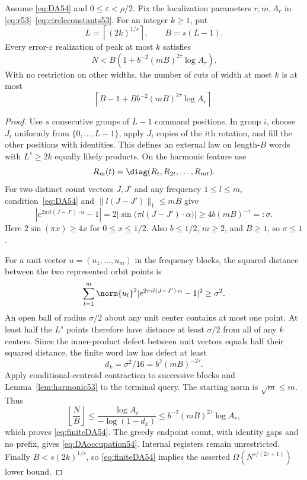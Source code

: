 \begin{theorem}\label{thm:arithmetic54}
Assume \eqref{eq:DA54} and $0\le\varepsilon<\rho/2$. Fix the localization parameters $r,m,A_r$ in \eqref{eq:r53}--\eqref{eq:circleconstants53}. For an integer $k\ge1$, put
\[
 L=\left\lceil(2k)^{1/s}\right\rceil,\qquad B=s(L-1).
\]
Every error-$\varepsilon$ realization of peak at most $k$ satisfies
\begin{equation}\label{eq:finiteDA54}
 N<B\left(1+b^{-2}(mB)^{2\tau}\log A_r\right).
\end{equation}
With no restriction on other widths, the number of cuts of width at most $k$ is at most
\begin{equation}\label{eq:DAoccupation54}
 \left\lceil B-1+B b^{-2}(mB)^{2\tau}\log A_r\right\rceil.
\end{equation}
\end{theorem}
\begin{proof}
Use $s$ consecutive groups of $L-1$ command positions. In group $i$, choose $J_i$ uniformly from $\{0,\ldots,L-1\}$, apply $J_i$ copies of the $i$th rotation, and fill the other positions with identities. This defines an external law on length-$B$ words with $L^s\ge2k$ equally likely products. On the harmonic feature use
\[
 R_m(t)=\diag(R_t,R_{2t},\ldots,R_{mt}).
\]
For two distinct count vectors $J,J'$ and any frequency $1\le l\le m$, condition~\eqref{eq:DA54} and $\|l(J-J')\|_1\le mB$ give
\[
 |e^{2\pi i l(J-J')\cdot\alpha}-1|
 =2\bigl|\sin\bigl(\pi l(J-J')\cdot\alpha\bigr)\bigr|
 \ge4b(mB)^{-\tau}=:\sigma.
\]
Here $2\sin(\pi x)\ge4x$ for $0\le x\le1/2$. Also $b\le1/2$, $m\ge2$, and $B\ge1$, so $\sigma\le1$.

For a unit vector $u=(u_1,\ldots,u_m)$ in the frequency blocks, the squared distance between the two represented orbit points is
\[
 \sum_{l=1}^m\norm{u_l}^2
       |e^{2\pi i l(J-J')\cdot\alpha}-1|^2\ge\sigma^2.
\]
An open ball of radius $\sigma/2$ about any unit center contains at most one point. At least half the $L^s$ points therefore have distance at least $\sigma/2$ from all of any $k$ centers. Since the inner-product defect between unit vectors equals half their squared distance, the finite word law has defect at least
\[
                  d_k=\sigma^2/16=b^2(mB)^{-2\tau}.
\]
Apply conditional-centroid contraction to successive blocks and Lemma~\ref{lem:harmonic53} to the terminal query. The starting norm is $\sqrt m\le m$. Thus
\[
 \left\lfloor\frac NB\right\rfloor
 \le\frac{\log A_r}{-\log(1-d_k)}
 \le b^{-2}(mB)^{2\tau}\log A_r,
\]
which proves \eqref{eq:finiteDA54}. The greedy endpoint count, with identity gaps and no prefix, gives \eqref{eq:DAoccupation54}. Internal registers remain unrestricted. Finally $B<s(2k)^{1/s}$, so \eqref{eq:finiteDA54} implies the asserted $\Omega(N^{s/(2\tau+1)})$ lower bound.
\end{proof}

